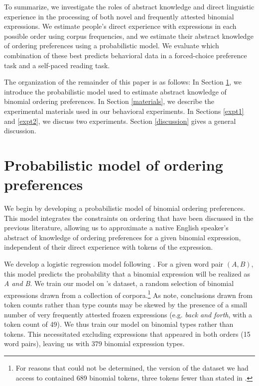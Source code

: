 \documentclass[authoryear]{elsarticle}
\begin{document}
To summarize, we investigate the roles of abstract knowledge and direct linguistic experience in the processing of both novel and frequently attested binomial expressions. We estimate people's direct experience with expressions in each possible order using corpus frequencies, and we estimate their abstract knowledge of ordering preferences using a probabilistic model. We evaluate which combination of these best predicts behavioral data in  a forced-choice preference task and a self-paced reading task.

The organization of the remainder of this paper is as follows: In Section \ref{model}, we introduce the probabilistic model used to estimate abstract knowledge of binomial ordering preferences. In Section \ref{materials}, we describe the experimental materials used in our behavioral experiments. In Sections \ref{expt1} and \ref{expt2}, we discuss two experiments. Section \ref{discussion} gives a general discussion.

\section{Probabilistic model of ordering preferences}\label{model}
We begin by developing a probabilistic model of binomial ordering preferences. This model integrates the constraints on ordering that have been discussed in the previous literature, allowing us to approximate a native English speaker's abstract of knowledge of ordering preferences for a given binomial expression, independent of their direct experience with tokens of the expression.

We develop a logistic regression model following \citet{Benor:2006gv}. For a given word pair $(A,B)$, this model predicts the probability that a binomial expression will be realized as \emph{A and B}. We train our model on \citeauthor{Benor:2006gv}'s dataset, a random selection of binomial expressions drawn from a collection of corpora.\footnote{For reasons that could not be determined, the version of the dataset we had access to contained 689 binomial tokens, three tokens fewer than stated in \citeauthor{Benor:2006gv}.} As \citeauthor{Benor:2006gv} note, conclusions drawn from token counts rather than type counts may be skewed by the presence of a small number of very frequently attested frozen expressions (e.g. \emph{back and forth}, with a token count of 49). We thus train our model on binomial types rather than tokens. This necessitated excluding expressions that appeared in both orders (15 word pairs), leaving us with 379 binomial expression types.
\end{document}
